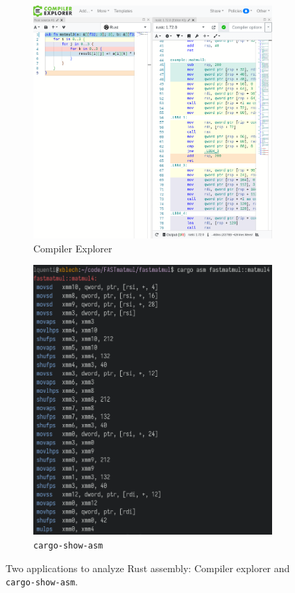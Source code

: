 \begin{figure}[H]
\centering
\begin{subfigure}{.5\textwidth}
  \centering
  \includegraphics[width=\linewidth]{./assets/compexp}
  \caption{Compiler Explorer}
\end{subfigure}%
\begin{subfigure}{.45\textwidth}
  \centering
  \includegraphics[width=\linewidth]{./assets/cargoasm}
  \caption{\texttt{cargo-show-asm}}
\end{subfigure}
  \caption{Two applications to analyze Rust assembly: Compiler explorer and \texttt{cargo-show-asm}.}
\end{figure}

